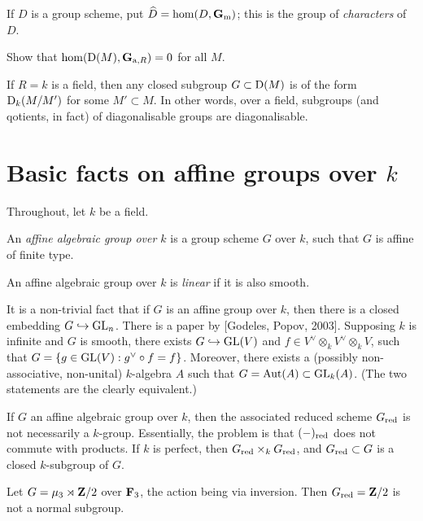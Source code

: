 \documentclass{article}
\begin{document}
If $D$ is a group scheme, put $\widehat D=\hom(D,\mathbf{G}_{\mathrm{m}})$; this is the group 
of \emph{characters} of $D$. 

\begin{exercise}
Show that $\hom(\operatorname{D}(M), \mathbf{G}_{\mathrm{a},R}) = 0$ for all $M$. 
\end{exercise}

If $R=k$ is a field, then any closed subgroup $G\subset \operatorname{D}(M)$ is of 
the form $\operatorname{D}_k(M/M')$ for some $M'\subset M$. In other words, over a 
field, subgroups (and qotients, in fact) of diagonalisable groups are 
diagonalisable. 





\section{Basic facts on affine groups over \texorpdfstring{$k$}{k}}

Throughout, let $k$ be a field. 

\begin{definition}
An \emph{affine algebraic group over $k$} is a group scheme $G$ over $k$, such 
that $G$ is affine of finite type. 
\end{definition}

\begin{definition}
An affine algebraic group over $k$ is \emph{linear} if it is also smooth. 
\end{definition}

It is a non-trivial fact that if $G$ is an affine group over $k$, then there is 
a closed embedding $G\hookrightarrow \operatorname{GL}_n$. There is a paper by 
[Godeles, Popov, 2003]. Supposing $k$ is infinite and $G$ is smooth, there 
exists $G\hookrightarrow \operatorname{GL}(V)$ and 
$f\in V^\vee\otimes_k V^\vee\otimes_k V$, such that 
$G=\{g\in \operatorname{GL}(V):g^\vee\circ f = f\}$. Moreover, there exists a 
(possibly non-associative, non-unital) $k$-algebra $A$ such that 
$G=\operatorname{Aut}(A)\subset \operatorname{GL}_k(A)$. (The two statements are the 
clearly equivalent.) 

If $G$ an affine algebraic group over $k$, then the associated reduced scheme 
$G_{\mathrm{red}}$ is not necessarily a $k$-group. Essentially, the problem is that 
$(-)_{\mathrm{red}}$ does not commute with products. If $k$ is perfect, then 
$G_{\mathrm{red}}\times_k G_{\mathrm{red}}$, and $G_{\mathrm{red}}\subset G$ is a closed 
$k$-subgroup of $G$. 

\begin{example}
Let $G=\mu_3\rtimes \mathbf{Z}/2$ over $\mathbf{F}_3$, the action being via inversion. Then 
$G_{\mathrm{red}}=\mathbf{Z}/2$ is not a normal subgroup. 
\end{example}
\end{document}
